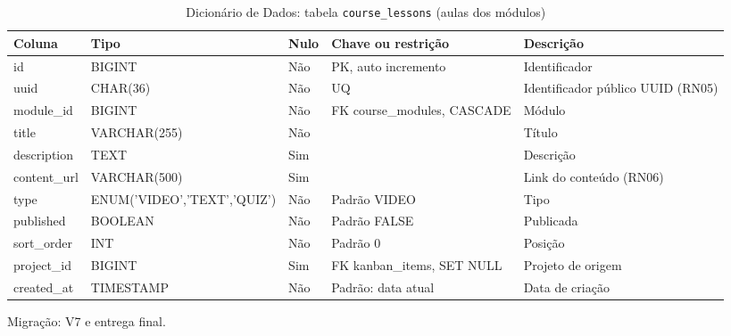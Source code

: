 \begin{table}[H]
\centering
\footnotesize
\caption{Dicionário de Dados: tabela \texttt{course\_\allowbreak{}lessons} (aulas dos módulos)}
\label{tab:dd-course-lessons}
\begin{tabular}{|>{\raggedright\arraybackslash}p{3.0cm}|>{\raggedright\arraybackslash}p{3.2cm}|>{\centering\arraybackslash}p{0.8cm}|>{\raggedright\arraybackslash}p{3.0cm}|>{\raggedright\arraybackslash}p{3.8cm}|}
\hline
\textbf{Coluna} & \textbf{Tipo} & \textbf{Nulo} & \textbf{Chave ou restrição} & \textbf{Descrição} \\
\hline
id & BIGINT & Não & PK, auto incremento & Identificador \\
\hline
uuid & CHAR(36) & Não & UQ & Identificador público UUID (RN05) \\
\hline
module\_\allowbreak{}id & BIGINT & Não & FK course\_\allowbreak{}modules, CASCADE & Módulo \\
\hline
title & VARCHAR(255) & Não &  & Título \\
\hline
description & TEXT & Sim &  & Descrição \\
\hline
content\_\allowbreak{}url & VARCHAR(500) & Sim &  & Link do conteúdo (RN06) \\
\hline
type & ENUM('VIDEO',\allowbreak 'TEXT',\allowbreak 'QUIZ') & Não & Padrão VIDEO & Tipo \\
\hline
published & BOOLEAN & Não & Padrão FALSE & Publicada \\
\hline
sort\_\allowbreak{}order & INT & Não & Padrão 0 & Posição \\
\hline
project\_\allowbreak{}id & BIGINT & Sim & FK kanban\_\allowbreak{}items, SET NULL & Projeto de origem \\
\hline
created\_\allowbreak{}at & TIMESTAMP & Não & Padrão: data atual & Data de criação \\
\hline
\end{tabular}
\par\footnotesize Migração: V7 e entrega final.
\end{table}

